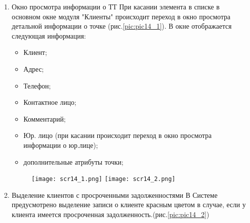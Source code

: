 \begin{enumerate}[\thesection .1]
\item Окно просмотра информации о ТТ
При касании элемента в списке в основном окне модуля "Клиенты" происходит переход в окно просмотра детальной информации о точке (рис.\ref{pic:pic14_1}). В окне отображается следующая информация: 
\begin{itemize}
	\item Клиент;
	\item Адрес;
	\item Телефон;
	\item Контактное лицо;
	\item Комментарий;
	\item Юр. лицо (при касании происходит переход в окно просмотра информации о юр.лице);
	\item дополнительные атрибуты точки;	
\end{itemize}
\begin{figure}[!h]
	\begin{floatrow}
		{\texttt{[image: scr14\_1.png]}}
		{\texttt{[image: scr14\_2.png]}}         
	\end{floatrow}
\end{figure}
\item Выделение клиентов с просроченными задолженностями
В Системе предусмотрено выделение записи о клиенте красным цветом в случае, если у клиента имеется просроченная задолженность.(рис.\ref{pic:pic14_2})
\end{enumerate}